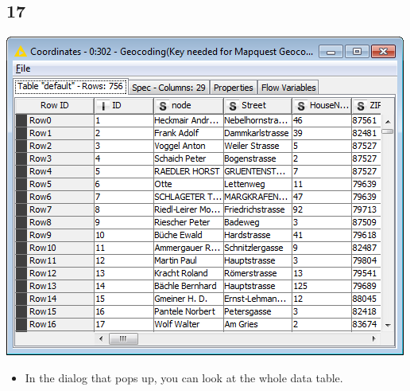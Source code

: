 \documentclass{beamer}
\begin{document}
\subsection{17}
\begin{frame}
	\begin{center}
  		\includegraphics[height=0.6\textheight]{17.png}
	\end{center}
	\begin{itemize}
		\item In the dialog that pops up, you can look at the whole data table.
	\end{itemize}
\end{frame}
\end{document}
